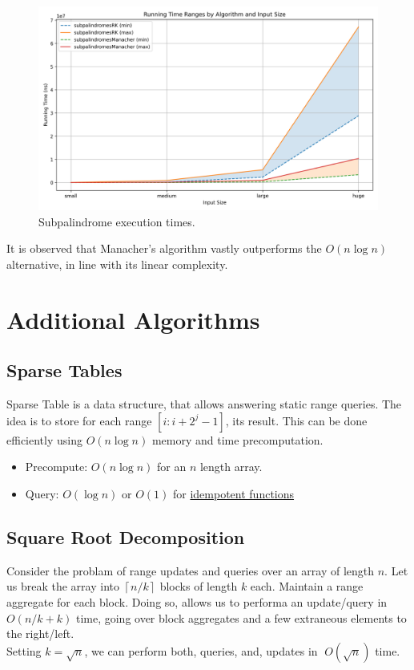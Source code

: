 \documentclass[12pt]{article}
\begin{document}
\begin{figure}[H]
  \centering
  \includegraphics[width=0.7\linewidth]{palindrome-stats.png}
  \caption{Subpalindrome execution times.}
\end{figure}

It is observed that Manacher's algorithm vastly outperforms the $O(n\log n)$ alternative, in line with its linear complexity.

\section{Additional Algorithms}\label{sec:additional-algorithms-detail}

\subsection{Sparse Tables\cite{sparse_table_cp}}
Sparse Table is a data structure, that allows answering static range queries.  
The idea is to store for each range $[i:i + 2^j - 1]$, its result. This can be done efficiently using $O(n\log n)$ memory and time precomputation.  
\begin{itemize}
  \item Precompute: $O(n \log n)$ for an $n$ length array.
  \item Query: $O(\log n)$ or $O(1)$ for \hyperref[https://en.wikipedia.org/wiki/Idempotence]{idempotent functions}
\end{itemize}

\subsection{Square Root Decomposition\cite{sqrt_decomposition_cp}}
Consider the problam of range updates and queries over an array of length $n$.  
Let us break the array into $\left\lceil n/k \right\rceil$ blocks of length $k$ each.\cite{cs166_0}
Maintain a range aggregate for each block.  
Doing so, allows us to performa an update/query in $O(n/k + k)$ time, going over block aggregates and a few extraneous elements to the right/left.   \\
Setting $k = \sqrt n$, we can perform both, queries, and, updates in $\;O(\sqrt n)$ time.
\end{document}
